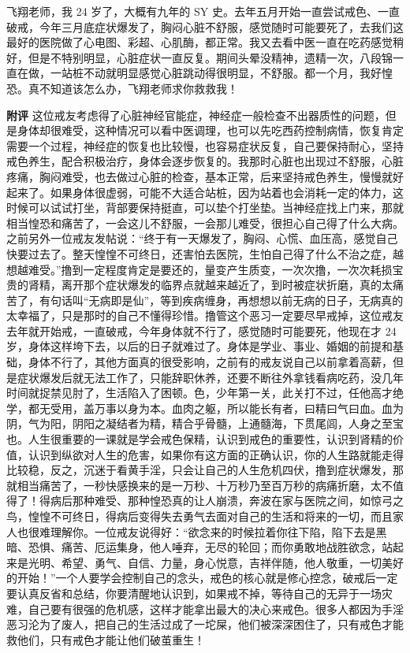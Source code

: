 \begin{case}
    飞翔老师，我 24 岁了，大概有九年的 SY 史。去年五月开始一直尝试戒色、一直破戒，今年三月底症状爆发了，胸闷心脏不舒服，感觉随时可能要死了，去我们这最好的医院做了心电图、彩超、心肌酶，都正常。我又去看中医一直在吃药感觉稍好，但是不特别明显，心脏症状一直反复。期间头晕没精神，遗精一次，八段锦一直在做，一站桩不动就明显感觉心脏跳动得很明显，不舒服。都一个月，我好惶恐。真不知道该怎么办，飞翔老师求你救救我！

    \textbf{附评} 这位戒友考虑得了心脏神经官能症，神经症一般检查不出器质性的问题，但是身体却很难受，这种情况可以看中医调理，也可以先吃西药控制病情，恢复肯定需要一个过程，神经症的恢复也比较慢，也容易症状反复，自己要保持耐心，坚持戒色养生，配合积极治疗，身体会逐步恢复的。我那时心脏也出现过不舒服，心脏疼痛，胸闷难受，也去做过心脏的检查，基本正常，后来坚持戒色养生，慢慢就好起来了。如果身体很虚弱，可能不大适合站桩，因为站着也会消耗一定的体力，这时候可以试试打坐，背部要保持挺直，可以垫个打坐垫。当神经症找上门来，那就相当惶恐和痛苦了，一会这儿不舒服，一会那儿难受，很担心自己得了什么大病。之前另外一位戒友发帖说：“终于有一天爆发了，胸闷、心慌、血压高，感觉自己快要过去了。整天惶惶不可终日，还害怕去医院，生怕自己得了什么不治之症，越想越难受。”撸到一定程度肯定是要还的，量变产生质变，一次次撸，一次次耗损宝贵的肾精，离开那个症状爆发的临界点就越来越近了，到时被症状折磨，真的太痛苦了，有句话叫“无病即是仙”，等到疾病缠身，再想想以前无病的日子，无病真的太幸福了，只是那时的自己不懂得珍惜。撸管这个恶习一定要尽早戒掉，这位戒友去年就开始戒，一直破戒，今年身体就不行了，感觉随时可能要死，他现在才 24 岁，身体这样垮下去，以后的日子就难过了。身体是学业、事业、婚姻的前提和基础，身体不行了，其他方面真的很受影响，之前有的戒友说自己以前拿着高薪，但是症状爆发后就无法工作了，只能辞职休养，还要不断往外拿钱看病吃药，没几年时间就捉禁见肘了，生活陷入了困顿。色，少年第一关，此关打不过，任他高才绝学，都无受用，盖万事以身为本。血肉之躯，所以能长有者，曰精曰气曰血。血为阴，气为阳，阴阳之凝结者为精，精合乎骨髓，上通髓海，下贯尾闾，人身之至宝也。人生很重要的一课就是学会戒色保精，认识到戒色的重要性，认识到肾精的价值，认识到纵欲对人生的危害，如果你有这方面的正确认识，你的人生路就能走得比较稳，反之，沉迷于看黄手淫，只会让自己的人生危机四伏，撸到症状爆发，那就相当痛苦了，一秒快感换来的是一万秒、十万秒乃至百万秒的病痛折磨，太不值得了！得病后那种难受、那种惶恐真的让人崩溃，奔波在家与医院之间，如惊弓之鸟，惶惶不可终日，得病后变得失去勇气去面对自己的生活和将来的一切，而且家人也很难理解你。一位戒友说得好：“欲念来的时候拉着你往下陷，陷下去是黑暗、恐惧、痛苦、厄运集身，他人唾弃，无尽的轮回；而你勇敢地战胜欲念，站起来是光明、希望、勇气、自信、力量，身心悦意，吉祥伴随，他人敬重，一切美好的开始！”一个人要学会控制自己的念头，戒色的核心就是修心控念，破戒后一定要认真反省和总结，你要清醒地认识到，如果戒不掉，等待自己的无异于一场灾难，自己要有很强的危机感，这样才能拿出最大的决心来戒色。很多人都因为手淫恶习沦为了废人，把自己的生活过成了一坨屎，他们被深深困住了，只有戒色才能救他们，只有戒色才能让他们破茧重生！
\end{case}

